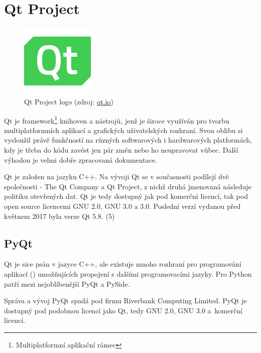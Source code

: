 \section{Qt Project}

\begin{figure}[H] \centering
      \includegraphics[width=100pt]{./pictures/qt_logo_green_256x256px.png}
      \caption[Qt Project logo]{Qt Project logo (zdroj:
\href{http://brand.qt.io/downloads/}{qt.io})}
      \label{fig:qt}
  \end{figure}

Qt je framework\footnote{Multiplatformní aplikační rámec} knihoven a
nástrojů, jenž je široce využíván pro tvorbu multiplatformních
aplikací a grafických uživatelských rozhraní. Svou oblibu si vysloužil
právě funkčností na různých softwarových i hardwarových platformách,
kdy je třeba do kódu zavést jen pár změn nebo ho neupravovat
vůbec. Další výhodou je velmi dobře zpracovaná dokumentace.

Qt je založen na jazyku C++. Na vývoji Qt se v současnosti podílejí
dvě společnosti - The Qt Company a Qt Project, z nichž druhá jmenovaná
následuje politiku otevřených dat. Qt je tedy dostupný jak pod
komerční licencí, tak pod open source licencemi GNU  2.0, GNU
 3.0 a  3.0. Poslední verzí vydanou před květnem 2017
byla verze Qt 5.8. (5)


\subsection{PyQt} Qt je sice psán v jazyce C++, ale existuje mnoho
rozhraní pro programování aplikací () umožňujících propojení s
dalšími programovacími jazyky. Pro Python patří mezi nejoblíbenější
PyQt a PySide.

Správa a vývoj PyQt spadá pod firmu Riverbank Computing Limited. PyQt
je dostupný pod podobnou licencí jako Qt, tedy GNU  2.0, GNU
 3.0 a~komerční licencí.


